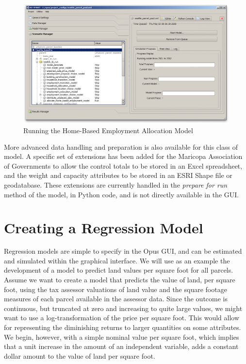\begin{figure}[htp]
\begin{center}
\includegraphics[scale=0.35]{graphics/create-allocation-model-run.png}
\end{center}
\caption{Running the Home-Based Employment Allocation Model}
\label{fig:model-allocation-3}
\end{figure}

More advanced data handling and preparation is also available for this class of model.  A specific set of extensions has been added for the Maricopa Association of Governments to allow the control totals to be stored in an Excel spreadsheet, and the weight and capacity attributes to be stored in an ESRI Shape file or geodatabase.  These extensions are currently handled in the \emph{prepare for run} method of the model, in Python code, and is not directly available in the GUI.

\section{Creating a Regression Model}

Regression models are simple to specify in the Opus GUI, and can be estimated and simulated within the graphical interface.  We will use as an example the development of a model to predict land values per square foot for all parcels.  Assume we want to create a model that predicts the value of land, per square foot, using the tax assessor valuations of land value and the square footage measures of each parcel available in the assessor data.  Since the outcome is continuous, but truncated at zero and increasing to quite large values, we might want to use a log-transformation of the price per square foot.  This would allow for representing the diminishing returns to larger quantities on some attributes.  We begin, however, with a simple nominal value per square foot, which implies that a unit increase in the amount of an independent variable, adds a constant dollar amount to the value of land per square foot.

